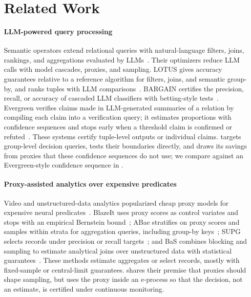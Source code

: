 \section{Related Work}
\label{sec:related}

\paragraph*{LLM-powered query processing}
Semantic operators extend relational queries with natural-language filters, joins, rankings, and aggregations evaluated by LLMs~\cite{lotus,docetl,uqe,thalamusdb}.
Their optimizers reduce LLM calls with model cascades, proxies, and sampling.
LOTUS gives accuracy guarantees relative to a reference algorithm for filters, joins, and semantic group-by, and ranks tuples with LLM comparisons~\cite{lotus}.
BARGAIN certifies the precision, recall, or accuracy of cascaded LLM classifiers with betting-style tests~\cite{bargain}.
Evergreen verifies claims made in LLM-generated summaries of a relation by compiling each claim into a verification query; it estimates proportions with confidence sequences and stops early when a threshold claim is confirmed or refuted~\cite{evergreen}.
These systems certify tuple-level outputs or individual claims.
\sys{} targets group-level decision queries, tests their boundaries directly, and draws its savings from proxies that these confidence sequences do not use; we compare against an Evergreen-style confidence sequence in .

\paragraph*{Proxy-assisted analytics over expensive predicates}
Video and unstructured-data analytics popularized cheap proxy models for expensive neural predicates~\cite{noscope,blazeit,supg,abae,tasti}.
BlazeIt uses proxy scores as control variates and stops with an empirical Bernstein bound~\cite{blazeit,mnih2008}; ABae stratifies on proxy scores and samples within strata for aggregation queries, including group-by keys~\cite{abae}; SUPG selects records under precision or recall targets~\cite{supg}; and BaS combines blocking and sampling to estimate analytical joins over unstructured data with statistical guarantees~\cite{bas}.
These methods estimate aggregates or select records, mostly with fixed-sample or central-limit guarantees.
\sys{} shares their premise that proxies should shape sampling, but uses the proxy inside an e-process so that the decision, not an estimate, is certified under continuous monitoring.

